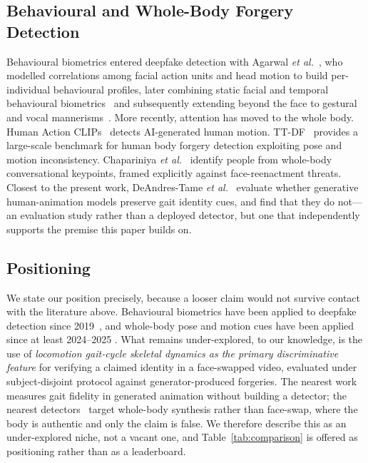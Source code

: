 \documentclass[journal]{IEEEtran}
\begin{document}
\subsection{Behavioural and Whole-Body Forgery Detection}

Behavioural biometrics entered deepfake detection with Agarwal
\emph{et al.}~\cite{agarwal2019}, who modelled correlations among facial action
units and head motion to build per-individual behavioural profiles, later
combining static facial and temporal behavioural
biometrics~\cite{agarwal2020} and subsequently extending beyond the face to
gestural and vocal mannerisms~\cite{agarwal_pnas}. More recently, attention has
moved to the whole body. Human Action CLIPs~\cite{humanactionclips} detects
AI-generated human motion. TT-DF~\cite{ttdf} provides a large-scale benchmark
for human body forgery detection exploiting pose and motion inconsistency.
Chapariniya \emph{et al.}~\cite{convkeypoints} identify people from
whole-body conversational keypoints, framed explicitly against face-reenactment
threats. Closest to the present work, DeAndres-Tame
\emph{et al.}~\cite{gaitfidelity} evaluate whether generative human-animation
models preserve gait identity cues, and find that they do not---an evaluation
study rather than a deployed detector, but one that independently supports the
premise this paper builds on.

\subsection{Positioning}

We state our position precisely, because a looser claim would not survive
contact with the literature above. Behavioural biometrics have been applied to
deepfake detection since 2019~\cite{agarwal2019}, and whole-body pose and
motion cues have been applied since at least 2024--2025
\cite{humanactionclips,ttdf,convkeypoints}. What remains under-explored, to our
knowledge, is the use of \emph{locomotion gait-cycle skeletal dynamics as the
primary discriminative feature} for verifying a claimed identity in a
face-swapped video, evaluated under subject-disjoint protocol against
generator-produced forgeries. The nearest work~\cite{gaitfidelity} measures
gait fidelity in generated animation without building a detector; the nearest
detectors~\cite{ttdf,humanactionclips} target whole-body synthesis rather than
face-swap, where the body is authentic and only the claim is false. We
therefore describe this as an under-explored niche, not a vacant one, and
Table~\ref{tab:comparison} is offered as positioning rather than as a
leaderboard.
\end{document}
